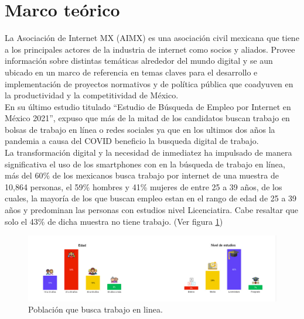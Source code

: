 \clearpage
\section{Marco teórico}
    La Asociación de Internet MX (AIMX) es una asociación civil mexicana que tiene a los principales actores de la industria 
    de internet como socios y aliados. Provee información sobre distintas temáticas alrededor del mundo digital y se aun ubicado 
    en un marco de referencia en temas claves para el desarrollo e implementación de proyectos normativos y de política pública 
    que coadyuven en la productividad y la competitividad de México.\\ 

    En su último  estudio titulado ``Estudio de Búsqueda de Empleo por Internet en México 2021'', expuso que más de la mitad de 
    los candidatos buscan trabajo en bolsas de trabajo en línea o redes sociales ya que en los ultimos dos años
    la pandemia a causa del COVID beneficio la busqueda digital de trabajo.\\
    \newline
    La transformación digital y la necesidad de inmediatez ha impulsado de manera significativa el uso de los smartphones con 
    en la búsqueda de trabajo en línea, más del 60\% de los mexicanos busca trabajo por internet de una muestra de 10,864 personas, 
    el 59\% hombres y 41\% mujeres de entre 25 a 39 años, de los cuales, la mayoría de los que buscan empleo estan en el rango de 
    edad de 25 a 39 años y predominan las personas con estudios nivel Licenciatira.
    Cabe resaltar que solo el 43\% de dicha muestra no tiene trabajo. (Ver figura \ref{mark:pob}) 
    \begin{figure}[H]
        \begin{center}
            \includegraphics[width=.9\textwidth]{antecedentes/imagenes/porcen.jpeg}
        \end{center}
        \caption{Población que busca trabajo en linea.}
        \label{mark:pob}
    \end{figure}
    


